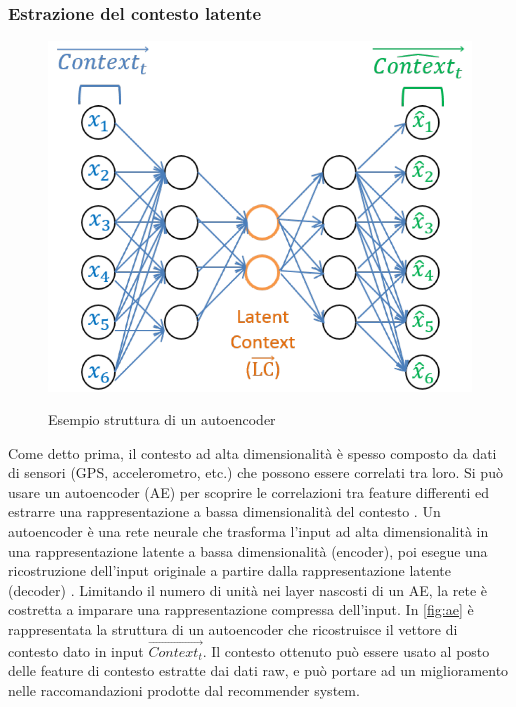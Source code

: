 \subsubsection{Estrazione del contesto latente} 
\label{ssec:latent-context}
\begin{figure}
 \centering
  \includegraphics[scale=0.65]{immagini/autoencoder.png}
  \caption{Esempio struttura di un autoencoder}
  \cite{hierarchical-context}
  \label{fig:ae}
\end{figure}

Come detto prima, il contesto ad alta dimensionalità è spesso composto da dati di sensori (GPS, accelerometro, etc.) che possono essere correlati tra loro. Si può usare un autoencoder (AE) per scoprire le correlazioni tra feature differenti ed estrarre una rappresentazione a bassa dimensionalità del contesto \cite{latent-context}. Un autoencoder è una rete neurale che trasforma l'input ad alta dimensionalità in una rappresentazione latente a bassa dimensionalità (encoder), poi esegue una ricostruzione dell'input originale a partire dalla rappresentazione latente (decoder) \cite{autoencoder}. Limitando il numero di unità nei layer nascosti di un AE, la rete è costretta a imparare una rappresentazione compressa dell'input. In \autoref{fig:ae} è rappresentata la struttura di un autoencoder che ricostruisce il vettore di contesto dato in input $\overrightarrow{Context_t}$. Il contesto ottenuto può essere usato al posto delle feature di contesto estratte dai dati raw, e può portare ad un miglioramento nelle raccomandazioni prodotte dal recommender system.

